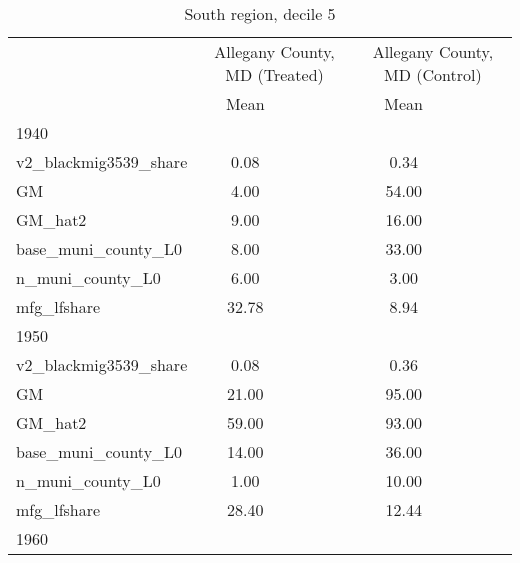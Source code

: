 \begin{table}[htbp]\centering
\def\sym#1{\ifmmode^{#1}\else\(^{#1}\)\fi}
\caption{South region, decile 5 \label{tab1}}
\begin{tabular}{l*{2}{ccc}}
\toprule
                    &\multicolumn{3}{c}{Allegany County, MD (Treated)}&\multicolumn{3}{c}{Allegany County, MD (Control)}\\
                    &        Mean&            &            &        Mean&            &            \\
\midrule
1940                &            &            &            &            &            &            \\
v2\_blackmig3539\_share&        0.08&            &            &        0.34&            &            \\
GM                  &        4.00&            &            &       54.00&            &            \\
GM\_hat2             &        9.00&            &            &       16.00&            &            \\
base\_muni\_county\_L0 &        8.00&            &            &       33.00&            &            \\
n\_muni\_county\_L0    &        6.00&            &            &        3.00&            &            \\
mfg\_lfshare         &       32.78&            &            &        8.94&            &            \\
\midrule
1950                &            &            &            &            &            &            \\
v2\_blackmig3539\_share&        0.08&            &            &        0.36&            &            \\
GM                  &       21.00&            &            &       95.00&            &            \\
GM\_hat2             &       59.00&            &            &       93.00&            &            \\
base\_muni\_county\_L0 &       14.00&            &            &       36.00&            &            \\
n\_muni\_county\_L0    &        1.00&            &            &       10.00&            &            \\
mfg\_lfshare         &       28.40&            &            &       12.44&            &            \\
\midrule
1960                &            &            &            &            &            &            \\

\end{tabular}
\end{table}
